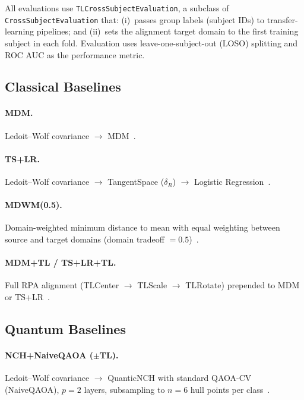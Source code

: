 \documentclass{article}
\begin{document}
All evaluations use \texttt{TLCrossSubjectEvaluation}, a subclass of
\texttt{CrossSubjectEvaluation} that: (i)~passes group labels (subject IDs)
to transfer-learning pipelines; and (ii)~sets the alignment target domain to
the first training subject in each fold.  Evaluation uses leave-one-subject-out
(LOSO) splitting and ROC AUC as the performance metric.

\subsection{Classical Baselines}

\paragraph{MDM.}
Ledoit--Wolf covariance $\rightarrow$ MDM~\cite{barachant2012multiclass}.

\paragraph{TS+LR.}
Ledoit--Wolf covariance $\rightarrow$ TangentSpace ($\delta_R$) $\rightarrow$
Logistic Regression~\cite{yger2017riemannian}.

\paragraph{MDWM(0.5).}
Domain-weighted minimum distance to mean with equal weighting between source
and target domains (domain tradeoff $=0.5$)~\cite{zanini2018transfer}.

\paragraph{MDM+TL / TS+LR+TL.}
Full RPA alignment (TLCenter $\rightarrow$ TLScale $\rightarrow$
TLRotate) prepended to MDM or TS+LR~\cite{rodrigues2019riemannian}.

\subsection{Quantum Baselines}

\paragraph{NCH+NaiveQAOA ($\pm$TL).}
Ledoit--Wolf covariance $\rightarrow$ QuanticNCH with standard QAOA-CV
(NaiveQAOA), $p=2$ layers, subsampling to $n=6$ hull points per
class~\cite{quanticNCH2023}.
\end{document}
